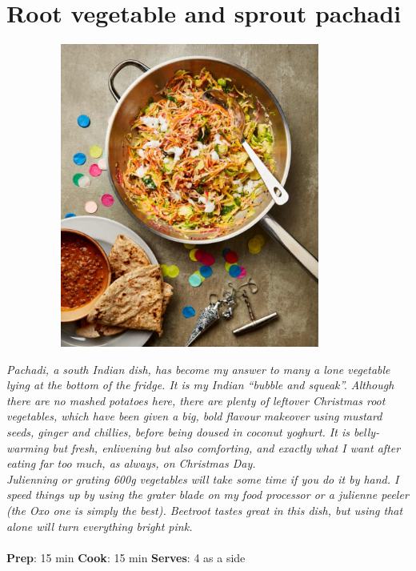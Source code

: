 \documentclass{book}
\begin{document}
\section{Root vegetable and sprout pachadi}
\begin{figure}
\centering\includegraphics[width=10cm,height=10cm,keepaspectratio]{Recipe_Pictures/Root_vegetable_and_sprout_pachadi.png}
\end{figure}
\emph{Pachadi, a south Indian dish, has become my answer to many a lone vegetable lying at the bottom of the fridge. It is my Indian “bubble and squeak”. Although there are no mashed potatoes here, there are plenty of leftover Christmas root vegetables, which have been given a big, bold flavour makeover using mustard seeds, ginger and chillies, before being doused in coconut yoghurt. It is belly-warming but fresh, enlivening but also comforting, and exactly what I want after eating far too much, as always, on Christmas Day.\\ 
Julienning or grating 600g vegetables will take some time if you do it by hand. I speed things up by using the grater blade on my food processor or a julienne peeler (the Oxo one is simply the best). Beetroot tastes great in this dish, but using that alone will turn everything bright pink.}\\\\ 
\textbf{Prep}: 15 min
\textbf{Cook}: 15 min
\textbf{Serves}: 4 as a side
\end{document}
